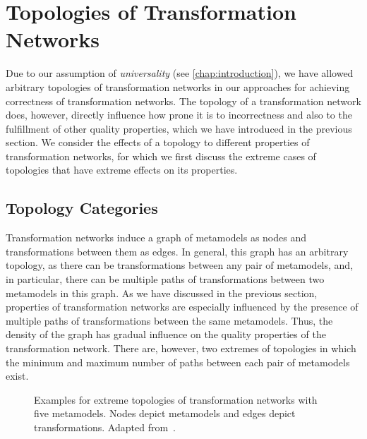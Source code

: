 \section{Topologies of Transformation Networks}
\label{chap:classification:topologies}

Due to our assumption of \emph{universality} (see \autoref{chap:introduction}), we have allowed arbitrary topologies of transformation networks in our approaches for achieving correctness of transformation networks.
The topology of a transformation network does, however, directly influence how prone it is to incorrectness and also to the fulfillment of other quality properties, which we have introduced in the previous section.
We consider the effects of a topology to different properties of transformation networks, for which we first discuss the extreme cases of topologies that have extreme effects on its properties.


\subsection{Topology Categories}

Transformation networks induce a graph of metamodels as nodes and transformations between them as edges.
In general, this graph has an arbitrary topology, as there can be transformations between any pair of metamodels, and, in particular, there can be multiple paths of transformations between two metamodels in this graph.
As we have discussed in the previous section, properties of transformation networks are especially influenced by the presence of multiple paths of transformations between the same metamodels.
Thus, the density of the graph has gradual influence on the quality properties of the transformation network.
There are, however, two extremes of topologies in which the minimum and maximum number of paths between each pair of metamodels exist.

\begin{figure}
    \centering
    \begin{minipage}[b]{0.49\columnwidth}
        \centering
        
        \label{fig:classification:topologies:complete}
    \end{minipage}
    \hfill
    \begin{minipage}[b]{0.49\columnwidth}
        \centering
        
        \vspace{1em}
        \label{fig:classification:topologies:tree}
    \end{minipage}
    \caption[Extremes of transformation network topologies]{Examples for extreme topologies of transformation networks with five metamodels. Nodes depict metamodels and edges depict transformations. Adapted from~.}
    \label{fig:classification:topologies}
\end{figure}

